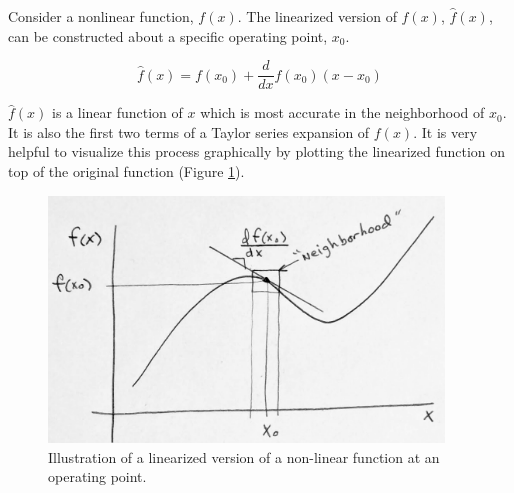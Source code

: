 Consider a nonlinear function, $f(x)$.  The linearized version of $f(x)$, $\hat{f}(x)$,  can be constructed about a specific operating point, $x_0$.

\[
\hat{f}(x) = f(x_0) + \frac{d}{dx}f(x_0) (x-x_0)
\]

$\hat{f}(x)$ is a linear function of $x$ which is most accurate in the neighborhood of $x_0$.   It is also the  first two terms of a Taylor series expansion of $f(x)$.   It is very helpful to visualize this process graphically by plotting the linearized function on top of the original function (Figure \ref{locallinearizationSketch}).

\begin{figure}\label{locallinearizationSketch}
  \includegraphics[width=105mm]{figs01/Q75B05.png}
  \caption{Illustration of a linearized version of a non-linear function at an operating point.}
\end{figure}
\clearpage



